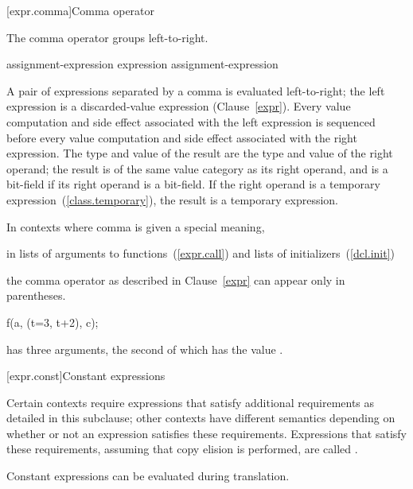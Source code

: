 [expr.comma]{Comma operator}%
%
%
%
%
%

\pnum
The comma operator groups left-to-right.

\begin{bnf}
\br
    assignment-expression\br
    expression \terminal{,} assignment-expression
\end{bnf}

A pair of expressions separated by a comma is evaluated left-to-right;
the left expression is
a discarded-value expression (Clause~\ref{expr}).
Every
%
value computation and side effect
associated with the left expression is sequenced before every value
computation and side effect associated with the right expression.
%
The type and value of the
result are the type and value of the right operand; the result is of the same
value category as its right operand, and is a bit-field if its
right operand is a bit-field.
If the right operand is a temporary expression~(\ref{class.temporary}),
the result is a temporary expression.

\pnum
In contexts where comma is given a special meaning, \begin{example} in
lists of arguments to functions~(\ref{expr.call}) and lists of
initializers~(\ref{dcl.init}) \end{example} the comma operator as
described in Clause~\ref{expr} can appear only in parentheses.
\begin{example}

\begin{codeblock}
f(a, (t=3, t+2), c);
\end{codeblock}

has three arguments, the second of which has the value
.
\end{example}

[expr.const]{Constant expressions}%

\pnum
Certain contexts require expressions that satisfy additional
requirements as detailed in this subclause; other contexts have different
semantics depending on whether or not an expression satisfies these requirements.
Expressions that satisfy these requirements,
assuming that copy elision is performed,
are called 
%
. \begin{note} Constant expressions can be evaluated
during translation.\end{note}

